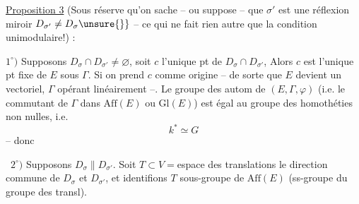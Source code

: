 \uline{Proposition 3} (Sous réserve qu'on sache -- ou suppose -- que $\sigma'$ est une réflexion  miroir $D_{\sigma'}\ne D_\sigma\unsure{\}}$ -- ce qui ne fait rien autre que la condition unimodulaire!) :

$1^\circ)$ Supposons $D_\sigma\cap D_{\sigma'}\ne\varnothing$, soit $c$ l'unique pt de $D_\sigma\cap D_{\sigma'}$,  Alors  $c$ est l'unique pt fixe de $E$ sous $\Gamma$. Si on prend $c$ comme origine -- de sorte que $E$ devient un vectoriel, $\Gamma$ opérant linéairement --. Le groupe  des autom de $(E,\Gamma,\varphi)$ (i.e. le commutant de $\Gamma$ dans $\mathrm{Aff}(E)$ ou $\mathrm{Gl}(E)$) est égal au groupe des  homothéties non nulles, i.e.
\[
k^*\simeq G
\]
-- donc  

\ $2^\circ)$ Supposons $D_\sigma\parallel D_{\sigma'}$. Soit $T\subset V={}$espace des translations le   direction commune de $D_\sigma$ et $D_{\sigma'}$, et identifions $T$    sous-groupe de $\mathrm{Aff}(E)$ (ss-groupe du groupe des transl).
